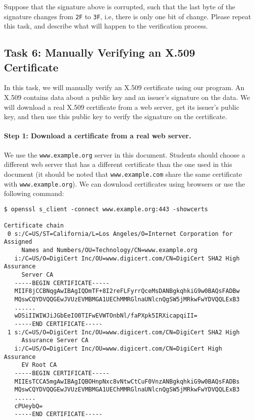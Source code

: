 Suppose that the signature above is corrupted, such that the 
last byte of the signature changes from \texttt{2F} to \texttt{3F}, i.e, there is only one bit
of change.  Please repeat this task, 
and describe what will happen to the verification process. 




\subsection{Task 6: Manually Verifying an X.509 Certificate}

In this task, we will manually verify an X.509 certificate using our program. 
An X.509 contains data about a public key and an issuer's signature on the data. 
We will download a real X.509 certificate from a web server, get its issuer's public key, and then
use this public key to verify the signature on the certificate. 


\paragraph{Step 1: Download a certificate from a real web server.} 
We use the \texttt{www.example.org} server in this document. Students 
should choose a different web server that has a different certificate than the one used in this
document (it should be noted that \texttt{www.example.com} share the same certificate with
\texttt{www.example.org}). 
We can download certificates using browsers or use the following command: 

\begin{lstlisting}
$ openssl s_client -connect www.example.org:443 -showcerts

Certificate chain
 0 s:/C=US/ST=California/L=Los Angeles/O=Internet Corporation for Assigned 
     Names and Numbers/OU=Technology/CN=www.example.org
   i:/C=US/O=DigiCert Inc/OU=www.digicert.com/CN=DigiCert SHA2 High Assurance 
     Server CA
   -----BEGIN CERTIFICATE-----
   MIIF8jCCBNqgAwIBAgIQDmTF+8I2reFLFyrrQceMsDANBgkqhkiG9w0BAQsFADBw
   MQswCQYDVQQGEwJVUzEVMBMGA1UEChMMRGlnaUNlcnQgSW5jMRkwFwYDVQQLExB3
   ......
   wDSiIIWIWJiJGbEeIO0TIFwEVWTOnbNl/faPXpk5IRXicapqiII=
   -----END CERTIFICATE-----
 1 s:/C=US/O=DigiCert Inc/OU=www.digicert.com/CN=DigiCert SHA2 High 
     Assurance Server CA
   i:/C=US/O=DigiCert Inc/OU=www.digicert.com/CN=DigiCert High Assurance 
     EV Root CA
   -----BEGIN CERTIFICATE-----
   MIIEsTCCA5mgAwIBAgIQBOHnpNxc8vNtwCtCuF0VnzANBgkqhkiG9w0BAQsFADBs
   MQswCQYDVQQGEwJVUzEVMBMGA1UEChMMRGlnaUNlcnQgSW5jMRkwFwYDVQQLExB3
   ...... 
   cPUeybQ=
   -----END CERTIFICATE-----
\end{lstlisting}

